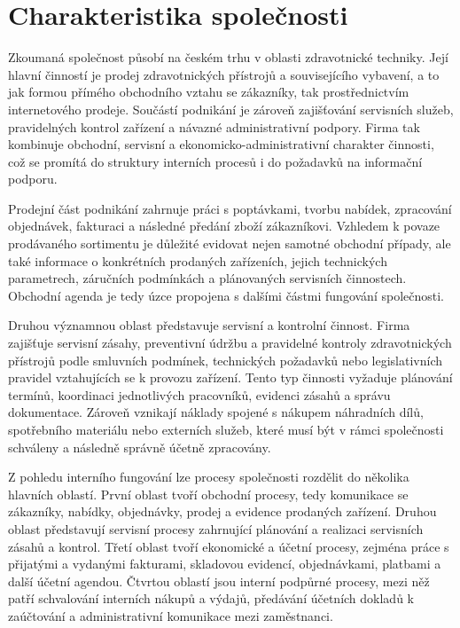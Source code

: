 \section{Charakteristika společnosti}

Zkoumaná společnost působí na českém trhu v oblasti zdravotnické techniky. Její hlavní činností je prodej zdravotnických přístrojů a souvisejícího vybavení, a to jak formou přímého obchodního vztahu se zákazníky, tak prostřednictvím internetového prodeje. Součástí podnikání je zároveň zajišťování servisních služeb, pravidelných kontrol zařízení a návazné administrativní podpory. Firma tak kombinuje obchodní, servisní a ekonomicko-administrativní charakter činnosti, což se promítá do struktury interních procesů i do požadavků na informační podporu.

Prodejní část podnikání zahrnuje práci s poptávkami, tvorbu nabídek, zpracování objednávek, fakturaci a následné předání zboží zákazníkovi. Vzhledem k povaze prodávaného sortimentu je důležité evidovat nejen samotné obchodní případy, ale také informace o konkrétních prodaných zařízeních, jejich technických parametrech, záručních podmínkách a plánovaných servisních činnostech. Obchodní agenda je tedy úzce propojena s dalšími částmi fungování společnosti.

Druhou významnou oblast představuje servisní a kontrolní činnost. Firma zajišťuje servisní zásahy, preventivní údržbu a pravidelné kontroly zdravotnických přístrojů podle smluvních podmínek, technických požadavků nebo legislativních pravidel vztahujících se k provozu zařízení. Tento typ činnosti vyžaduje plánování termínů, koordinaci jednotlivých pracovníků, evidenci zásahů a správu dokumentace. Zároveň vznikají náklady spojené s nákupem náhradních dílů, spotřebního materiálu nebo externích služeb, které musí být v rámci společnosti schváleny a následně správně účetně zpracovány.

Z pohledu interního fungování lze procesy společnosti rozdělit do několika hlavních oblastí. První oblast tvoří obchodní procesy, tedy komunikace se zákazníky, nabídky, objednávky, prodej a evidence prodaných zařízení. Druhou oblast představují servisní procesy zahrnující plánování a realizaci servisních zásahů a kontrol. Třetí oblast tvoří ekonomické a účetní procesy, zejména práce s přijatými a vydanými fakturami, skladovou evidencí, objednávkami, platbami a další účetní agendou. Čtvrtou oblastí jsou interní podpůrné procesy, mezi něž patří schvalování interních nákupů a výdajů, předávání účetních dokladů k zaúčtování a administrativní komunikace mezi zaměstnanci.

